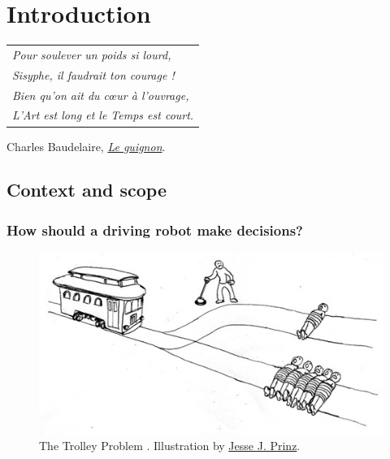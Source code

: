 
\graphicspath{{2-Chapters/1-Chapter/}}

\chapter{Introduction}
\label{chapter:1}

\begin{flushright}
	\begin{tabular}{@{}l@{}}
		\emph{Pour soulever un poids si lourd,}\\
		\emph{Sisyphe, il faudrait ton courage !}\\
		\emph{Bien qu’on ait du cœur à l’ouvrage,}\\
		\emph{L’Art est long et le Temps est court.}\\
	\end{tabular}

	Charles Baudelaire, \href{https://eleurent.github.io/sisyphe/texts/le-guignon.html}{\emph{Le guignon}}.
\end{flushright}

\section{Context and scope}


\subsection{How should a driving robot make decisions?}
\label{sec:trolley}


\begin{figure}[tp]
	\centering
	\includegraphics[width=0.7\linewidth]{img/trolley}
	\caption{The Trolley Problem \citep{Foot1967}. Illustration by \href{http://subcortex.com/}{Jesse J. Prinz}.}
	\label{fig:trolley}
\end{figure}

